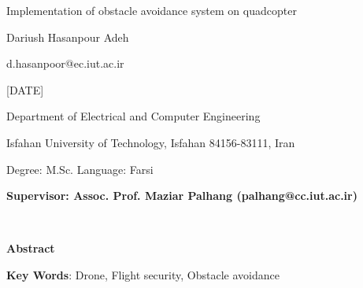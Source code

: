 \thispagestyle{empty}

\begin{latin}
\begin{center}

{\Huge Implementation of obstacle avoidance system on quadcopter}

\vspace{1cm}

{\LARGE{Dariush Hasanpour Adeh}}

\vspace{0.2cm}

{\small d.hasanpoor@ec.iut.ac.ir}

\vspace{0.5cm}

[DATE]

\vspace{0.5cm}

Department of Electrical and Computer Engineering

\vspace{0.2cm}

Isfahan University of Technology, Isfahan 84156-83111, Iran

\vspace{0.2cm}

Degree: M.Sc. \hspace*{3cm} Language: Farsi

\vspace{1cm}

{\small\textbf{Supervisor: Assoc. Prof. Maziar Palhang (palhang@cc.iut.ac.ir)}}
\end{center}
~\vfill



\noindent\textbf{Abstract}

\begin{small}
\baselineskip=0.6cm

\end{small}

\vspace{0.5 cm}

\noindent \textbf{Key Words}: Drone, Flight security, Obstacle avoidance

\end{latin}